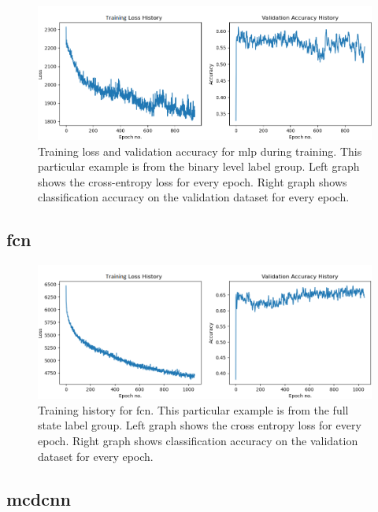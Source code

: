 \begin{figure}[h]
    \centering
    \includegraphics[width=\textwidth]{figures/res_tr_MLP_blevel.png}
    \caption{Training loss and validation accuracy for \acrlong{mlp} during training. This particular example is from the binary level label group. Left graph shows the cross-entropy loss for every epoch. Right graph shows classification accuracy on the validation dataset for every epoch.}
    \label{fig:res_tr_mlp}
\end{figure}
\FloatBarrier

\subsection{\acrlong{fcn}}

\begin{figure}[h]
    \centering
    \includegraphics[width=\textwidth]{figures/res_tr_FCN_fstate.png}
    \caption{Training history for \acrlong{fcn}. This particular example is from the full state label group. Left graph shows the cross entropy loss for every epoch. Right graph shows classification accuracy on the validation dataset for every epoch.}
    \label{fig:res_tr_fcn}
\end{figure}
\FloatBarrier

\newpage
\subsection{\acrlong{mcdcnn}}

